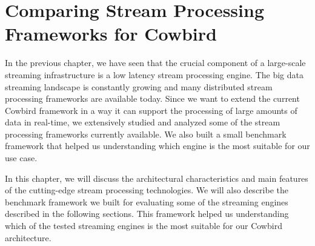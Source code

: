 \chapter{Comparing Stream Processing Frameworks for Cowbird}
In the previous chapter, we have seen that the crucial component of a large-scale streaming infrastructure is a low latency stream processing engine. The big data streaming landscape is constantly growing and many distributed stream processing frameworks are available today. Since we want to extend 
the current Cowbird framework in a way it can support the processing of large amounts of data in real-time, we extensively studied and analyzed some of the stream processing frameworks currently available. We also built a small benchmark framework that helped us understanding which engine is the most suitable for our use case. 

In this chapter, we will discuss the architectural characteristics and main features of the cutting-edge stream processing technologies. We will also describe the benchmark framework we built for evaluating some of the streaming engines described in the following sections. This framework helped us understanding which of the tested streaming engines is the most suitable for our Cowbird architecture.

